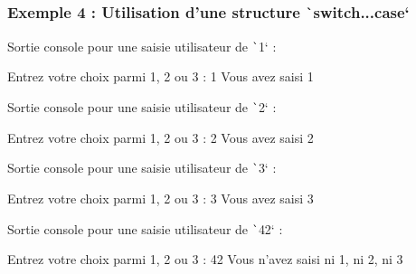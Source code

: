 \documentclass[10pt]{article}
\begin{document}
\subsubsection{Exemple 4 : Utilisation d'une structure \texttt`switch...case`}


\bigskip
Sortie console pour une saisie utilisateur de \texttt`1` :

\begin{textcode}
    Entrez votre choix parmi 1, 2 ou 3 : 1
    Vous avez saisi 1
\end{textcode}

Sortie console pour une saisie utilisateur de \texttt`2` :

\begin{textcode}
    Entrez votre choix parmi 1, 2 ou 3 : 2
    Vous avez saisi 2
\end{textcode}

Sortie console pour une saisie utilisateur de \texttt`3` :

\begin{textcode}
    Entrez votre choix parmi 1, 2 ou 3 : 3
    Vous avez saisi 3
\end{textcode}

Sortie console pour une saisie utilisateur de \texttt`42` :

\begin{textcode}
    Entrez votre choix parmi 1, 2 ou 3 : 42
    Vous n'avez saisi ni 1, ni 2, ni 3
\end{textcode}
\end{document}
